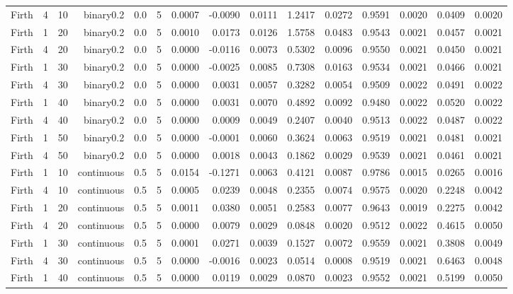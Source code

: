 \begin{longtable}{rrrrrrrrrrrrrrr}
  Firth & 4 & 10 & binary0.2 & 0.0 & 5 & 0.0007 & -0.0090 & 0.0111 & 1.2417 & 0.0272 & 0.9591 & 0.0020 & 0.0409 & 0.0020 \\ 
  Firth & 1 & 20 & binary0.2 & 0.0 & 5 & 0.0010 & 0.0173 & 0.0126 & 1.5758 & 0.0483 & 0.9543 & 0.0021 & 0.0457 & 0.0021 \\ 
  Firth & 4 & 20 & binary0.2 & 0.0 & 5 & 0.0000 & -0.0116 & 0.0073 & 0.5302 & 0.0096 & 0.9550 & 0.0021 & 0.0450 & 0.0021 \\ 
  Firth & 1 & 30 & binary0.2 & 0.0 & 5 & 0.0000 & -0.0025 & 0.0085 & 0.7308 & 0.0163 & 0.9534 & 0.0021 & 0.0466 & 0.0021 \\ 
  Firth & 4 & 30 & binary0.2 & 0.0 & 5 & 0.0000 & 0.0031 & 0.0057 & 0.3282 & 0.0054 & 0.9509 & 0.0022 & 0.0491 & 0.0022 \\ 
  Firth & 1 & 40 & binary0.2 & 0.0 & 5 & 0.0000 & 0.0031 & 0.0070 & 0.4892 & 0.0092 & 0.9480 & 0.0022 & 0.0520 & 0.0022 \\ 
  Firth & 4 & 40 & binary0.2 & 0.0 & 5 & 0.0000 & 0.0009 & 0.0049 & 0.2407 & 0.0040 & 0.9513 & 0.0022 & 0.0487 & 0.0022 \\ 
  Firth & 1 & 50 & binary0.2 & 0.0 & 5 & 0.0000 & -0.0001 & 0.0060 & 0.3624 & 0.0063 & 0.9519 & 0.0021 & 0.0481 & 0.0021 \\ 
  Firth & 4 & 50 & binary0.2 & 0.0 & 5 & 0.0000 & 0.0018 & 0.0043 & 0.1862 & 0.0029 & 0.9539 & 0.0021 & 0.0461 & 0.0021 \\ 
  Firth & 1 & 10 & continuous & 0.5 & 5 & 0.0154 & -0.1271 & 0.0063 & 0.4121 & 0.0087 & 0.9786 & 0.0015 & 0.0265 & 0.0016 \\ 
  Firth & 4 & 10 & continuous & 0.5 & 5 & 0.0005 & 0.0239 & 0.0048 & 0.2355 & 0.0074 & 0.9575 & 0.0020 & 0.2248 & 0.0042 \\ 
  Firth & 1 & 20 & continuous & 0.5 & 5 & 0.0011 & 0.0380 & 0.0051 & 0.2583 & 0.0077 & 0.9643 & 0.0019 & 0.2275 & 0.0042 \\ 
  Firth & 4 & 20 & continuous & 0.5 & 5 & 0.0000 & 0.0079 & 0.0029 & 0.0848 & 0.0020 & 0.9512 & 0.0022 & 0.4615 & 0.0050 \\ 
  Firth & 1 & 30 & continuous & 0.5 & 5 & 0.0001 & 0.0271 & 0.0039 & 0.1527 & 0.0072 & 0.9559 & 0.0021 & 0.3808 & 0.0049 \\ 
  Firth & 4 & 30 & continuous & 0.5 & 5 & 0.0000 & -0.0016 & 0.0023 & 0.0514 & 0.0008 & 0.9519 & 0.0021 & 0.6463 & 0.0048 \\ 
  Firth & 1 & 40 & continuous & 0.5 & 5 & 0.0000 & 0.0119 & 0.0029 & 0.0870 & 0.0023 & 0.9552 & 0.0021 & 0.5199 & 0.0050 \\ 

\end{longtable}
